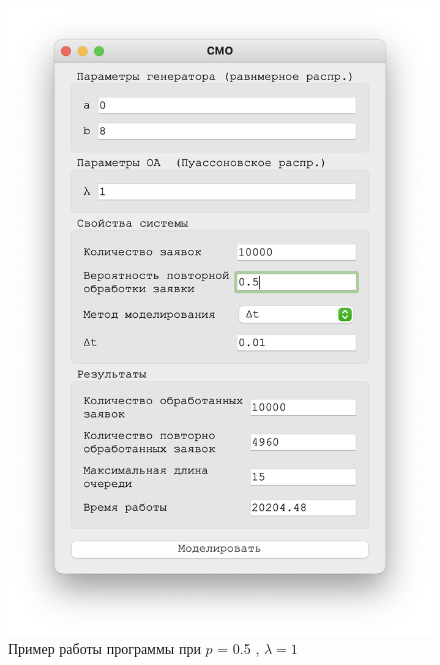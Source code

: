 \begin{figure}[!htb]
\begin{minipage}{0.55\textwidth}
      \includegraphics[width=1\linewidth]{1-5-t}
    \end{minipage}
    \caption{Пример работы программы при $p$ = 0.5 , $\lambda = 1$}
 \end{figure}

